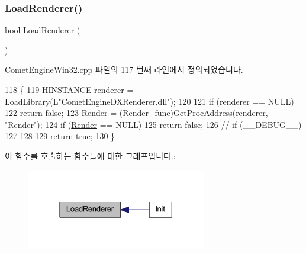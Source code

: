 \subsubsection{\texorpdfstring{Load\+Renderer()}{LoadRenderer()}}
{\footnotesize\ttfamily bool Load\+Renderer (\begin{DoxyParamCaption}{ }\end{DoxyParamCaption})\hspace{0.3cm}{\ttfamily [private]}}



Comet\+Engine\+Win32.\+cpp 파일의 117 번째 라인에서 정의되었습니다.


\begin{DoxyCode}
118 \{
119     HINSTANCE renderer = LoadLibrary(L\textcolor{stringliteral}{"CometEngineDXRenderer.dll"});
120     
121     \textcolor{keywordflow}{if} (renderer == NULL)
122         \textcolor{keywordflow}{return} \textcolor{keyword}{false};
123     \hyperlink{class_comet_engine_1_1_comet_engine_win32_a805efc6c9b43dd5daa64e3c1392d18b3}{Render} = (\hyperlink{class_comet_engine_1_1_comet_engine_win32_a97e4f6f1bfb397686ef973fe8bd42abf}{Render\_func})GetProcAddress(renderer, \textcolor{stringliteral}{"Render"});
124     \textcolor{keywordflow}{if} (\hyperlink{class_comet_engine_1_1_comet_engine_win32_a805efc6c9b43dd5daa64e3c1392d18b3}{Render} == NULL)
125         \textcolor{keywordflow}{return} \textcolor{keyword}{false};
126 \textcolor{comment}{//  if (\_\_DEBUG\_\_) }
127         
128     
129     \textcolor{keywordflow}{return} \textcolor{keyword}{true};
130 \}
\end{DoxyCode}
이 함수를 호출하는 함수들에 대한 그래프입니다.\+:\nopagebreak
\begin{figure}[H]
\begin{center}
\leavevmode
\includegraphics[width=222pt]{class_comet_engine_1_1_comet_engine_win32_a35f30fb8a7991557468d2fc3b25ff0b7_icgraph}
\end{center}
\end{figure}
\mbox{\label{class_comet_engine_1_1_comet_engine_win32_a69f7f5121282027943c96964bb85ef85}} 
